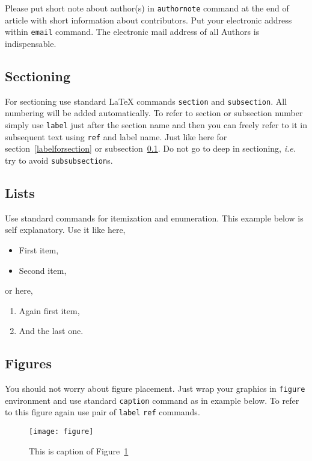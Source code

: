 \documentclass{rgg}
\begin{document}
    Please put short note about author(s)
    in \texttt{authornote} command 
    at the end of article with short information about
    contributors. Put your electronic address within
    \texttt{email} command.
    The electronic mail address of all Authors is indispensable.

  \subsection{Sectioning}
    \label{labelforsubsection}
    For sectioning use standard \LaTeX{} commands
    \texttt{section} and \texttt{subsection}.
    All numbering will be added automatically.
    To refer to section or subsection number
    simply use \texttt{label} just after the section
    name and then you can freely refer to it in subsequent text
    using \texttt{ref} and label name.
    Just like here for section~\ref{labelforsection} or
    subsection~\ref{labelforsubsection}.
    Do not go to deep in sectioning, \emph{i.e.} try to avoid
    \texttt{subsubsection}s.

  \subsection{Lists}
    Use standard commands for itemization and enumeration.
    This example below is self explanatory.
    Use it like here,
    \begin{itemize}
      \item First item,
      \item Second item,
    \end{itemize}
    or here,
    \begin{enumerate}
      \item Again first item,
      \item And the last one.
    \end{enumerate}

  \subsection{Figures}
    You should not worry about figure placement.
    Just wrap your graphics in \texttt{figure}
    environment and use standard \texttt{caption}
    command as in example below.
    To refer to this figure again use pair of \texttt{label}
    \texttt{ref} commands.
    \begin{figure}
      \texttt{[image: figure]}
      \caption{This is caption of Figure~\ref{figurecaption}}
      \label{figurecaption}
    \end{figure}
\end{document}

